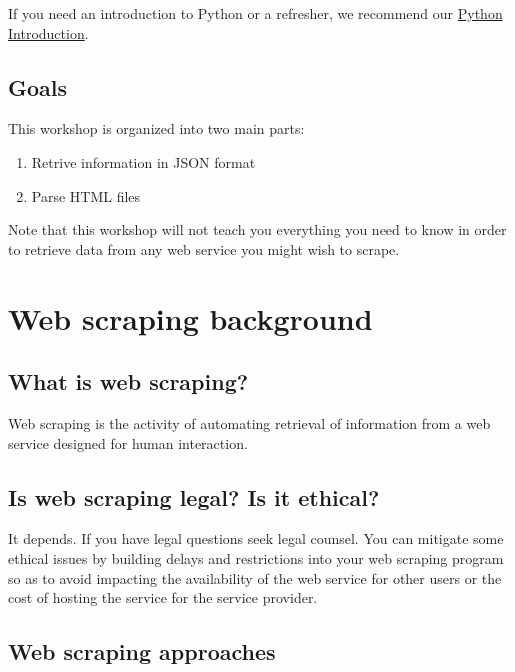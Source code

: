 \documentclass[
]{book}
\providecommand{\tightlist}{%
  \setlength{\itemsep}{0pt}\setlength{\parskip}{0pt}}
\begin{document}
If you need an introduction to Python or a refresher, we recommend our \href{https://iqss.github.io/dss-workshops/PythonIntro.html}{Python Introduction}.

\hypertarget{goals-4}{%
\subsection{Goals}\label{goals-4}}

This workshop is organized into two main parts:

\begin{enumerate}
\def\labelenumi{\arabic{enumi}.}
\tightlist
\item
  Retrive information in JSON format
\item
  Parse HTML files
\end{enumerate}

Note that this workshop will not teach you everything you need to know in order to retrieve data from any web service you might wish to scrape.

\hypertarget{web-scraping-background}{%
\section{Web scraping background}\label{web-scraping-background}}

\hypertarget{what-is-web-scraping}{%
\subsection{What is web scraping?}\label{what-is-web-scraping}}

Web scraping is the activity of automating retrieval of information from a web service designed for human interaction.

\hypertarget{is-web-scraping-legal-is-it-ethical}{%
\subsection{Is web scraping legal? Is it ethical?}\label{is-web-scraping-legal-is-it-ethical}}

It depends. If you have legal questions seek legal counsel. You can mitigate some ethical issues by building delays and restrictions into your web scraping program so as to avoid impacting the availability of the web service for other users or the cost of hosting the service for the service provider.

\hypertarget{web-scraping-approaches}{%
\subsection{Web scraping approaches}\label{web-scraping-approaches}}
\end{document}
